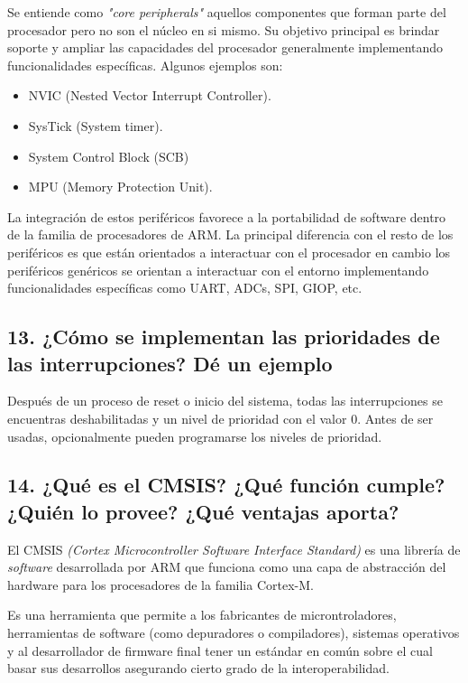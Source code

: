 \documentclass[10pt,a4paper,twoside,spanish]{article}	%
\begin{document}
Se entiende como \textit{"core peripherals"} aquellos componentes que forman parte del procesador pero no son el núcleo en si mismo. Su objetivo principal es brindar soporte y ampliar las capacidades del procesador generalmente implementando funcionalidades específicas. Algunos ejemplos son:
\begin{itemize}

\item NVIC (Nested Vector Interrupt Controller).
\item SysTick (System timer).
\item System Control Block (SCB)
\item MPU (Memory Protection Unit).
\end{itemize}

La integración de estos periféricos favorece a la portabilidad de software dentro de la familia de procesadores de ARM. La principal diferencia con el resto de los periféricos es que están orientados a interactuar con el procesador en cambio los periféricos genéricos se orientan a interactuar con el entorno implementando funcionalidades específicas como UART, ADCs, SPI, GIOP, etc.



\subsection*{13. ¿Cómo se implementan las prioridades de las interrupciones? Dé un ejemplo}

Después de un proceso de reset o inicio del sistema, todas las interrupciones se encuentras deshabilitadas y un nivel de prioridad con el valor 0. Antes de ser usadas, opcionalmente pueden programarse los niveles de prioridad.


\subsection*{14. ¿Qué es el CMSIS? ¿Qué función cumple? ¿Quién lo provee? ¿Qué ventajas aporta?}

El CMSIS \textit{(Cortex Microcontroller Software Interface Standard)} es una librería de \textit{software} desarrollada por ARM que funciona como  una capa de abstracción del hardware para los procesadores de la familia Cortex-M.

Es una herramienta que permite a los fabricantes de microntroladores, herramientas de software (como depuradores o compiladores), sistemas operativos y al desarrollador de firmware final tener un estándar en común sobre el cual basar sus desarrollos asegurando cierto grado de la interoperabilidad.
\end{document}
